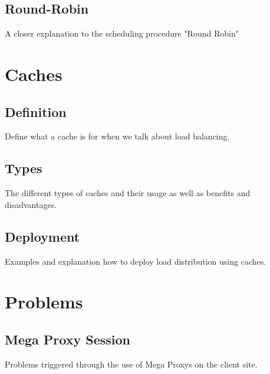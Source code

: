 \documentclass[12p]{article}
\begin{document}
	\subsection{Round-Robin}
	A closer explanation to the scheduling procedure "Round Robin"
	
	\newpage
	\section{Caches}
	\subsection{Definition}
	Define what a cache is for when we talk about load balancing.
	\subsection{Types}
	The different types of caches and their usage as well as benefits and disadvantages.
	\subsection{Deployment}
	Examples and explanation how to deploy load distribution using caches.
	
	\newpage
	\section{Problems}
	\subsection{Mega Proxy Session}
	Problems triggered through the use of Mega Proxys on the client site.
	
	\newpage
	\printglossaries
	
	\newpage
	
	
	
	\newpage
\end{document}
